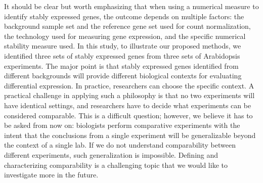 \documentclass[letterpaper,12pt]{article}
\begin{document}
			
			It should be clear but worth emphasizing that when using a numerical measure
			to identify stably expressed genes, the outcome depends on multiple factors:
			the background sample set and the reference gene set used for count
			normalization, the technology used
			for measuring gene expression, and the specific numerical stability measure
			used.  In this study, to illustrate our proposed methods, we identified three
			sets of stably expressed genes from three sets of Arabidopsis experiments. The
			major point is that stably expressed genes identified from different
			backgrounds will provide different biological contexts for evaluating
			differential expression. In practice, researchers can choose the specific
			context. A practical challenge in applying such a philosophy is that no two
			experiments will have identical settings, and researchers have to decide what
			experiments can be considered comparable. This is a difficult question;
			however, we believe it has to be asked from now on: biologists perform
			comparative experiments with the intent that the conclusions from a single
			experiment will be generalizable beyond the context of a single lab. If we do
			not understand comparability between different experiments, such
			generalization is impossible. Defining and characterizing comparability is a
			challenging topic that we would like to investigate more in the future.
			
			
			
\end{document}
